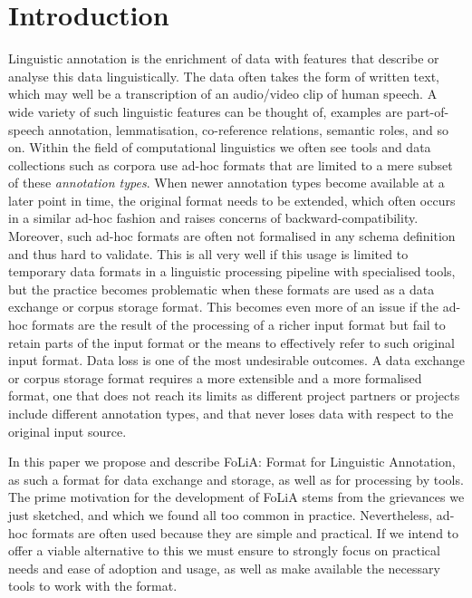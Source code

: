 \documentclass[a4paper,10pt,twoside]{article}
\begin{document}
\section{Introduction}

Linguistic annotation is the enrichment of data with features that describe or
analyse this data linguistically. The data often takes the form of written
text, which may well be a transcription of an audio/video clip of human speech.
A wide variety of such linguistic features can be thought of, examples are
part-of-speech annotation, lemmatisation, co-reference relations, semantic
roles, and so on. Within the field of computational linguistics we often see
tools and data collections such as corpora use ad-hoc formats that are limited
to a mere subset of these \emph{annotation types}. When newer annotation types
become available at a later point in time, the original format needs to be
extended, which often occurs in a similar ad-hoc fashion and raises concerns of
backward-compatibility. Moreover, such ad-hoc formats are often not formalised
in any schema definition and thus hard to validate. This is all very well if
this usage is limited to temporary data formats in a linguistic processing
pipeline with specialised tools, but the practice becomes problematic when
these formats are used as a data exchange or corpus storage format. This
becomes even more of an issue if the ad-hoc formats are the result of the
processing of a richer input format but fail to retain parts of the input
format or the means to effectively refer to such original input format.  Data
loss is one of the most undesirable outcomes. A data exchange or corpus storage
format requires a more extensible and a more formalised format, one that does
not reach its limits as different project partners or projects include
different annotation types, and that never loses data with respect to the
original input source.

In this paper we propose and describe FoLiA: Format for Linguistic Annotation,
as such a format for data exchange and storage, as well as for processing by
tools. The prime motivation for the development of FoLiA stems from the
grievances we just sketched, and which we found all too common in practice.
Nevertheless, ad-hoc formats are often used because they are simple and
practical. If we intend to offer a viable alternative to this we must ensure to
strongly focus on practical needs and ease of adoption and usage, as well as
make available the necessary tools to work with the format. 
\end{document}
